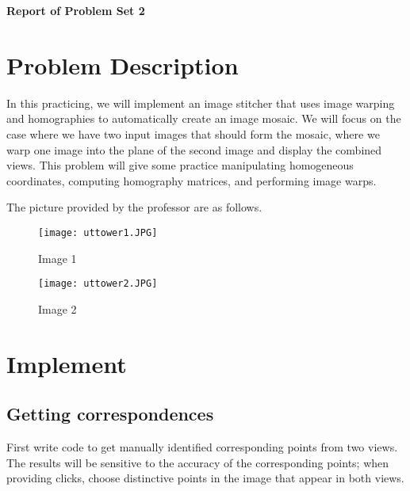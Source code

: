 \documentclass[UTF8,a4paper,10pt]{ctexart}
\begin{document}
\centerline{\LARGE\textbf{Report of Problem Set 2}} 
\vspace{1cm}

\quad\quad\quad\quad\qquad\qquad\qquad\qquad\qquad\qquad\qquad\qquad\qquad{}

\renewcommand\arraystretch{1.5}
\section{Problem Description}
In this practicing, we will implement an image stitcher that uses image warping and homographies to automatically create an image mosaic. We will focus on the case where we have two input images that should form the mosaic, where we warp one image into the plane of the second image and display the combined views. This problem will give some practice manipulating homogeneous coordinates, computing homography matrices, and performing image warps.

The picture provided by the professor are as follows.
\begin{figure}[H]
	\centering
	\begin{minipage}[t]{0,40\textwidth}	
		\centering
		\texttt{[image: uttower1.JPG]} %
		\caption{Image 1} %
		\label{p_ccjg} %
	\end{minipage}
	\hfil
	\begin{minipage}[t]{0,40\textwidth}	
		\centering
		\texttt{[image: uttower2.JPG]} %
		\caption{Image 2} %
		\label{p_AODV} %
	\end{minipage}
\end{figure}


\section{Implement}
\subsection{Getting correspondences}

First write code to get manually identified corresponding points from two views. The results will be sensitive to the accuracy of the corresponding points; when providing clicks, choose distinctive points in the image that appear in both views.
\end{document}
